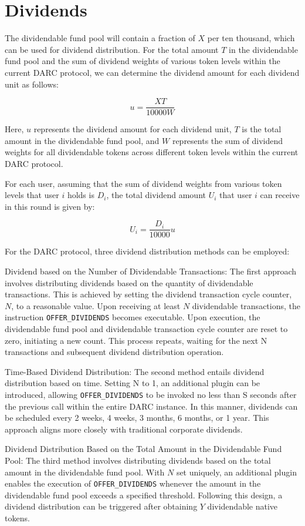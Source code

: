\documentclass[main.tex]{subfiles}
\begin{document}
\section{Dividends}

The dividendable fund pool will contain a fraction of $X$ per ten thousand, which can be used for dividend distribution. For the total amount $T$ in the dividendable fund pool and the sum of dividend weights of various token levels within the current DARC protocol, we can determine the dividend amount for each dividend unit as follows:

\[u = \frac{XT}{10000W}\]

Here, $u$ represents the dividend amount for each dividend unit, $T$ is the total amount in the dividendable fund pool, and $W$ represents the sum of dividend weights for all dividendable tokens across different token levels within the current DARC protocol.

For each user, assuming that the sum of dividend weights from various token levels that user $i$ holds is $D_i$, the total dividend amount $U_i$ that user $i$ can receive in this round is given by:

\[ U_i = \frac{D_i}{10000}u\]

For the DARC protocol, three dividend distribution methods can be employed:

Dividend based on the Number of Dividendable Transactions:
The first approach involves distributing dividends based on the quantity of dividendable transactions. This is achieved by setting the dividend transaction cycle counter, $N$, to a reasonable value. Upon receiving at least $N$ dividendable transactions, the instruction \texttt{OFFER\_DIVIDENDS} becomes executable. Upon execution, the dividendable fund pool and dividendable transaction cycle counter are reset to zero, initiating a new count. This process repeats, waiting for the next N transactions and subsequent dividend distribution operation.

Time-Based Dividend Distribution:
The second method entails dividend distribution based on time. Setting N to 1, an additional plugin can be introduced, allowing \texttt{OFFER\_DIVIDENDS} to be invoked no less than S seconds after the previous call within the entire DARC instance. In this manner, dividends can be scheduled every 2 weeks, 4 weeks, 3 months, 6 months, or 1 year. This approach aligns more closely with traditional corporate dividends.

Dividend Distribution Based on the Total Amount in the Dividendable Fund Pool:
The third method involves distributing dividends based on the total amount in the dividendable fund pool. With $N$ set uniquely, an additional plugin enables the execution of \texttt{OFFER\_DIVIDENDS} whenever the amount in the dividendable fund pool exceeds a specified threshold. Following this design, a dividend distribution can be triggered after obtaining $Y$ dividendable native tokens.
\end{document}
